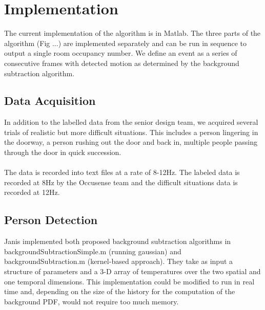 \documentclass[12pt,oneside]{article} %
\begin{document}
\section{Implementation}  %
The current implementation of the algorithm is in Matlab. The three parts of the algorithm (Fig ...)
are implemented
separately and can be run in sequence to output a single room occupancy number. We define an event as a series of consecutive frames with detected motion as determined by the background subtraction algorithm.

\subsection{Data Acquisition}  %
In addition to the labelled data from the senior design team, we acquired several trials of realistic but more
difficult situations. This includes a person lingering in the doorway, a person rushing out the door and back in, multiple people passing through
the door in quick succession.
\\ \\
The data is recorded into text files at a rate of 8-12Hz. The labeled data is recorded at 8Hz
by the Occusense team and the difficult situations data is recorded at 12Hz.

\subsection{Person Detection}
Janis implemented both proposed background subtraction algorithms in backgroundSubtractionSimple.m 
(running gaussian) and backgroundSubtraction.m (kernel-based approach).
They take as input a structure of parameters
and a 3-D array of temperatures over the two spatial and one temporal dimensions. This implementation could
be modified to run in real time and, depending on the size of the history for the computation of the background
PDF, would not require too much memory.
\end{document}
